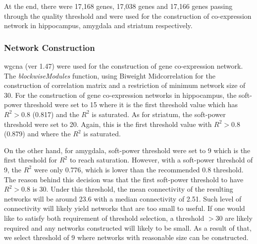At the end, there were 17,168 genes, 17,038 genes and 17,166 genes passing through the quality threshold and were used for the construction of co-expression network in hippocampus, amygdala and striatum respectively. 

\subsubsection{Network Construction}
\gls{wgcna} (ver 1.47) were used for the construction of gene co-expression network\citep{Langfelder2008}. 
The \emph{blockwiseModules} function, using Biweight Midcorrelation for the construction of correlation matrix and a restriction of minimum network size of 30. 
For the construction of gene co-expression networks in hippocampus, the soft-power threshold were set to 15 where it is the first threshold value which has $R^2 > 0.8$ (0.817) and the $R^2$ is saturated\citep{Zhang2005}.%
As for striatum, the soft-power threshold were set to 20. 
Again, this is the first threshold value with $R^2 >0.8$ (0.879) and where the $R^2$ is saturated.

On the other hand, for amygdala, soft-power threshold were set to 9 which is the first threshold for $R^2$ to reach saturation. 
However, with a soft-power threshold of 9, the $R^2$ were only 0.776, which is lower than the recommended 0.8 threshold.
The reason behind this decision was that the first soft-power threshold to have $R^2 > 0.8$ is 30.
Under this threshold, the mean connectivity of the resulting networks will be around 23.6 with a median connectivity of 2.51.
Such level of connectivity will likely yield networks that are too small to useful.
If one would like to satisfy both requirement of threshold selection, a threshold $>30$ are likely required and any networks constructed will likely to be small.
As a result of that, we select threshold of 9 where networks with reasonable size can be constructed.


